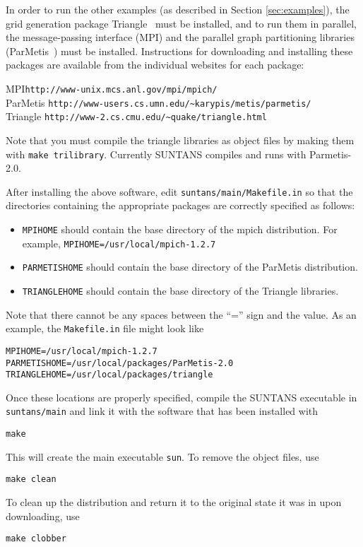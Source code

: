 In order to run the other examples (as described in Section \ref{sec:examples}), the
grid generation package Triangle~\cite{TRIANGLE[1996]} must be installed, and to
run them in parallel, the message-passing
interface (MPI) and the parallel graph partitioning libraries (ParMetis~\cite{PARMETIS[1998]})
must be installed. Instructions for 
downloading and installing these packages are available from the individual websites
for each package:
\begin{tabbing}
MPI\hspace{0.5in}\=  \verb+http://www-unix.mcs.anl.gov/mpi/mpich/+\\
ParMetis \> \verb+http://www-users.cs.umn.edu/~karypis/metis/parmetis/+\\
Triangle \> \verb+http://www-2.cs.cmu.edu/~quake/triangle.html+
\end{tabbing}
Note that you must compile the triangle libraries as object files by making them
with \verb+make trilibrary+.  Currently SUNTANS compiles and runs with Parmetis-2.0.

After installing the above software, edit \verb+suntans/main/Makefile.in+ 
so that the directories containing the appropriate packages
are correctly specified as follows:
\begin{itemize}
\item \verb+MPIHOME+ should contain the base directory of the mpich distribution.
For example, 
\verb+MPIHOME=/usr/local/mpich-1.2.7+
\item \verb+PARMETISHOME+ should contain the base directory of the ParMetis distribution.
\item \verb+TRIANGLEHOME+ should contain the base directory of the Triangle libraries.
\end{itemize}
Note that there cannot be any spaces between the ``='' sign and the value.  As an example,
the \verb+Makefile.in+ file might look like
\begin{verbatim}
MPIHOME=/usr/local/mpich-1.2.7
PARMETISHOME=/usr/local/packages/ParMetis-2.0
TRIANGLEHOME=/usr/local/packages/triangle
\end{verbatim}
Once these locations are properly specified, compile the SUNTANS executable in \verb+suntans/main+ and
link it with the software that has been installed with
\begin{verbatim}
make
\end{verbatim}
This will create the main executable \verb+sun+.  
To remove the object files, use
\begin{verbatim}
make clean
\end{verbatim}
To clean up the distribution and return it to the original state it was in upon downloading,
use
\begin{verbatim}
make clobber
\end{verbatim}

